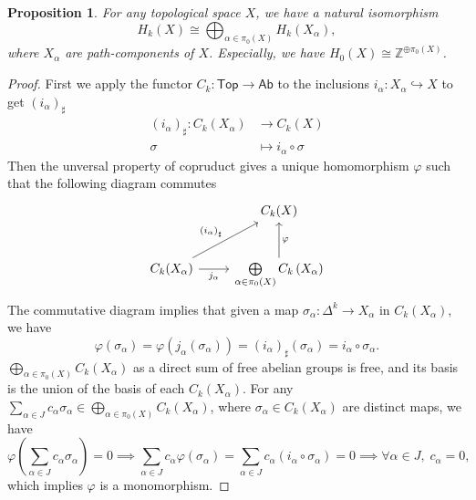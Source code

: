 \documentclass{report}
\newtheorem{proposition}{Proposition}[section]
\theoremstyle{nonumberplain}
\newtheorem{proof}{Proof.}
\begin{document}
\begin{proposition}
For any topological space $X$, we have a natural isomorphism 
$$
H_k(X)\cong\bigoplus_{\alpha\in \pi_0(X)} H_k\left(X_\alpha\right),
$$ 
where $X_\alpha$ are path-components of $X$. Especially, we have $H_0(X)\cong \mathbb{Z}^{\oplus \pi_0(X)}$. 
\end{proposition}
\begin{proof}
	First we apply the functor $C_k:\mathsf{Top}\to\mathsf{Ab}$ to the inclusions $i_\alpha:X_\alpha \hookrightarrow X$ to get $\left(i_\alpha\right)_\sharp$
	\begin{align*}
		\left(i_\alpha\right)_\sharp: C_k(X_\alpha)&\longrightarrow C_k(X)\\
                   \sigma &\longmapsto i_\alpha\circ \sigma
	\end{align*}
	Then the unversal property of copruduct gives a unique homomorphism $\varphi$ such that the following diagram commutes
	\begin{equation*}
		\begin{tikzcd}		
			& C_{k}(X) \\ [10pt]
			C_{k}(X_\alpha) \arrow[ru, "\left(i_\alpha \right)_{\sharp}"] \arrow[r, "j_\alpha"']
			& \bigoplus\limits_{\alpha\in \pi_0(X)} C_k\left(X_\alpha\right) \arrow[u, "\varphi"'] 
		\end{tikzcd}			
	\end{equation*}
	The commutative diagram implies that given a map $\sigma_\alpha:\Delta^k\to X_\alpha$ in $C_k(X_\alpha)$, we have
	\[
		\varphi(\sigma_\alpha)=\varphi(j_\alpha(\sigma_\alpha))=\left(i_\alpha\right)_\sharp(\sigma_\alpha)=i_\alpha\circ\sigma_\alpha.
	\]
	$\bigoplus\limits_{\alpha\in \pi_0(X)} C_k\left(X_\alpha\right)$ as a direct sum of free abelian groups is free, and its basis is the union of the basis of each $C_k\left(X_\alpha\right)$. 
	For any $\sum\limits_{\alpha\in J}c_\alpha\sigma_\alpha\in \bigoplus\limits_{\alpha\in \pi_0(X)} C_k\left(X_\alpha\right)$, where $\sigma_\alpha\in C_k\left(X_\alpha\right)$ are distinct maps, we have
	\[
		\varphi\left(\sum\limits_{\alpha\in J}c_\alpha\sigma_\alpha\right)=0\implies \sum_{\alpha\in J}c_\alpha\varphi\left(\sigma_\alpha\right)=\sum_{\alpha\in J} c_\alpha \left(i_\alpha\circ\sigma_\alpha\right)=0\implies \forall \alpha\in J,\;c_\alpha=0,
	\]
	which implies $\varphi$ is a monomorphism. 


\end{proof}
\end{document}
